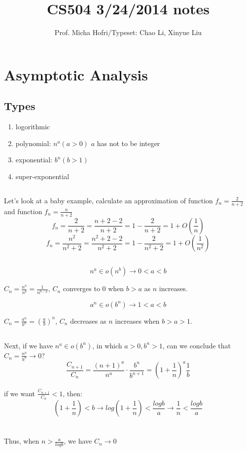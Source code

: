 \documentclass[11pt]{article}
\author{Prof. Micha Hofri/Typeset:  Chao Li, Xinyue Liu}
\title{CS504 3/24/2014 notes}
\begin{document}
\maketitle

\section{Asymptotic Analysis}

\subsection{Types}
\begin{enumerate}
\item logorithmic 
\item polynomial: $n^a (a>0) $ $a$ has not to be integer
\item exponential: $b^n (b>1)$ 
\item super-exponential $ $
\end{enumerate}

\subsection{}
Let's look at a baby example, calculate an approximation of function \(f_n=\frac{2}{n+2}\) and function \(f_n=\frac{n}{n+2}\)\\
\[ f_n = \frac{2}{n+2} = \frac{n+2-2}{n+2} = 1 - \frac{2}{n+2} = 1+ O(\frac{1}{n}) \]
\[
f_n=\frac{n^2}{n^2+2}=\frac{n^2+2-2}{n^2+2}=1-\frac{2}{n^2+2}=1+O(\frac{1}{n^2})
\]
\subsection{}
\[ n^a \in o(n^b) \rightarrow 0<a<b \]

$ C_n = \frac{n^a}{n^b} = \frac{1}{n^{b-a}}$, $C_n$ converges to $0$ when $b>a$ as $n$ increases.

\[a^n \in o(b^n) \rightarrow 1<a<b \]

$ C_n = \frac{a^n}{b^n} = (\frac{a}{b})^n$, $C_n$ decreases as $n$ increases when $b>a>1$.

\subsection{}
Next, if we have \(n^a\in o(b^n)\), in which \(a>0, b^n>1\), can we conclude that \( C_n = \frac{n^a}{b^n} \rightarrow 0 \)? \\

\[\frac{C_{n+1}}{C_n} = \frac{(n+1)^a}{n^a} \cdot \frac{b^n}{b^{n+1}} = (1+\frac1n)^a \frac1b\]\\
if we want $\frac{C_{n+1}}{C_n} < 1$, then:
\\
\[(1+\frac1n) < b \rightarrow log(1+\frac1n) < \frac{logb}{a} \rightarrow \frac1n < \frac{logb}{a} \] \\
\\
Thus, when $n>\frac{a}{logb}$, we have $C_n \rightarrow 0$
\end{document}
